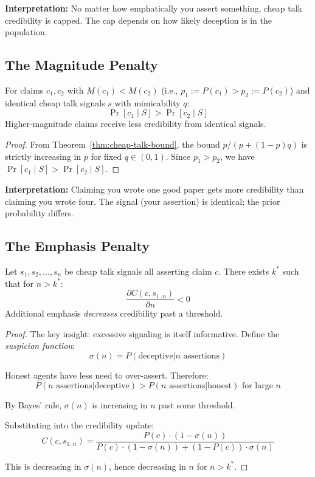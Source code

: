 \textbf{Interpretation:} No matter how emphatically you assert
something, cheap talk credibility is capped. The cap depends on how
likely deception is in the population.

\subsection{The Magnitude Penalty}\label{the-magnitude-penalty}

\begin{theorem}\label{thm:magnitude-penalty}
For claims $c_1, c_2$ with $M(c_1) < M(c_2)$ (i.e., $p_1 := P(c_1) > p_2 := P(c_2)$)
and identical cheap talk signals $s$ with mimicability $q$:
\[\Pr[c_1 \mid S] > \Pr[c_2 \mid S]\]
Higher-magnitude claims receive less credibility from identical signals.

 
\end{theorem}

\begin{proof}
From Theorem~\ref{thm:cheap-talk-bound}, the bound $p/(p+(1-p)q)$ is strictly
increasing in $p$ for fixed $q \in (0,1)$. Since $p_1 > p_2$, we have
$\Pr[c_1 \mid S] > \Pr[c_2 \mid S]$.
\end{proof}

\textbf{Interpretation:} Claiming you wrote one good paper gets more
credibility than claiming you wrote four. The signal (your assertion) is
identical; the prior probability differs.

\subsection{The Emphasis Penalty}\label{the-emphasis-penalty}

\begin{theorem}\label{thm:emphasis-penalty}
Let \(s_1, s_2, ..., s_n\) be cheap talk signals all asserting claim \(c\). There exists \(k^*\) such that for \(n > k^*\): \[\frac{\partial C(c, s_{1..n})}{\partial n} < 0\]
Additional emphasis \emph{decreases} credibility past a threshold.

  
\end{theorem}

\begin{proof}
The key insight: excessive signaling is itself informative. Define the
\emph{suspicion function}:
\[\sigma(n) = P(\text{deceptive} | n \text{ assertions})\]

Honest agents have less need to over-assert. Therefore:
\[P(n \text{ assertions} | \text{deceptive}) > P(n \text{ assertions} | \text{honest}) \text{ for large } n\]

By Bayes' rule, \(\sigma(n)\) is increasing in \(n\) past some
threshold.

Substituting into the credibility update:
\[C(c, s_{1..n}) = \frac{P(c) \cdot (1 - \sigma(n))}{P(c) \cdot (1 - \sigma(n)) + (1 - P(c)) \cdot \sigma(n)}\]

This is decreasing in \(\sigma(n)\), hence decreasing in \(n\) for
\(n > k^*\).
\end{proof}

